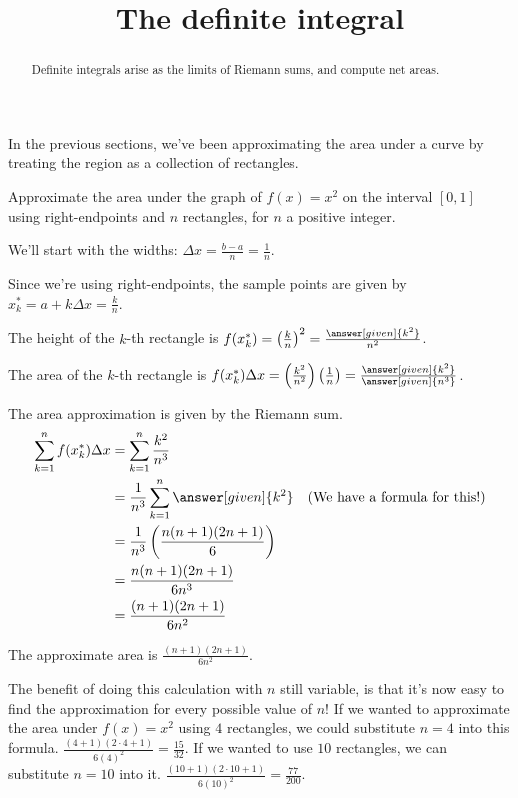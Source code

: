 \documentclass{ximera}
\title[Dig-In:]{The definite integral}
\begin{document}
\begin{abstract}
  Definite integrals arise as the limits of Riemann sums, and compute net areas.
\end{abstract}
\maketitle


In the previous sections, we've been approximating the area under a curve by treating the region as a collection of
rectangles. 

\begin{example}
	Approximate the area under the graph of $f(x)=x^2$ on the interval $[0,1]$ using right-endpoints and $n$ rectangles, for $n$ a positive integer.
	\begin{explanation}
		We'll start with the widths: $\Delta x = \frac{b-a}{n} = \frac{1}{n}$.
		
		Since we're using right-endpoints, the sample points are given by $x_k^* = a + k \Delta x = \frac{k}{n}$.
		
		The height of the $k$-th rectangle is $f(x_k^*) = \left( \frac{k}{n} \right)^2 = \frac{\answer[given]{k^2}}{n^2}$.
		
		The area of the $k$-th rectangle is $f(x_k^*)\Delta x = \left(\frac{k^2}{n^2}\right)\left( \frac{1}{n} \right) = \frac{\answer[given]{k^2}}{\answer[given]{n^3}}$.
		
		The area approximation is given by the Riemann sum.
		\begin{align*}
			\sum_{k=1}^{n} f(x_k^*) \Delta x &= \sum_{k=1}^n \frac{k^2}{n^3}\\
				&= \frac{1}{n^3} \sum_{k=1}^{n} \answer[given]{k^2} \quad \text{(We have a formula for this!)}\\
				&= \frac{1}{n^3} \left( \frac{n(n+1)(2n+1)}{6}\right)\\
				&= \frac{n(n+1)(2n+1)}{6n^3}\\
				&= \frac{(n+1)(2n+1)}{6n^2}
		\end{align*}

		The approximate area is $\frac{(n+1)(2n+1)}{6n^2}$.
	\end{explanation}
\end{example}

The benefit of doing this calculation with $n$ still variable, is that it's now easy to find the approximation for every possible value of $n$!
If we wanted to approximate the area under $f(x)=x^2$ using $4$ rectangles, we could substitute $n=4$ into this formula.
$\frac{(4+1)(2\cdot4+1)}{6(4)^2} = \frac{15}{32}$.  If we wanted to use $10$ rectangles, we can substitute $n=10$ into it.
$\frac{(10+1)(2\cdot 10+1)}{6(10)^2} = \frac{77}{200}$.
\end{document}

